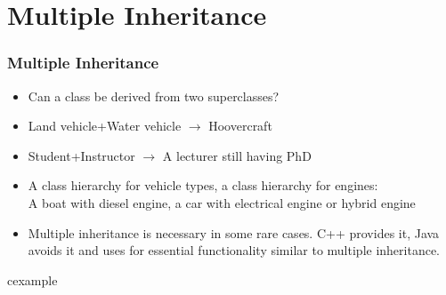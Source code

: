 \section{Multiple Inheritance}
\begin{frame}
\frametitle{Multiple Inheritance}
\begin{itemize}[<+->]
\item Can a class be derived from two superclasses?
\item Land vehicle+Water vehicle $\rightarrow$ Hoovercraft
\item Student+Instructor $\rightarrow$ A lecturer still having PhD
\item A class hierarchy for vehicle types, a class hierarchy for engines:\\
	A boat with diesel engine, a car with electrical engine or hybrid engine
\item Multiple inheritance is necessary in some rare cases. C++ provides it,
	Java avoids it and uses  for essential functionality similar to
	multiple inheritance.
\end{itemize}
\end{frame}

\begin{frame}
\begin{beamercolorbox}{cexample}
\codeMultInh
\end{beamercolorbox}
\end{frame}

